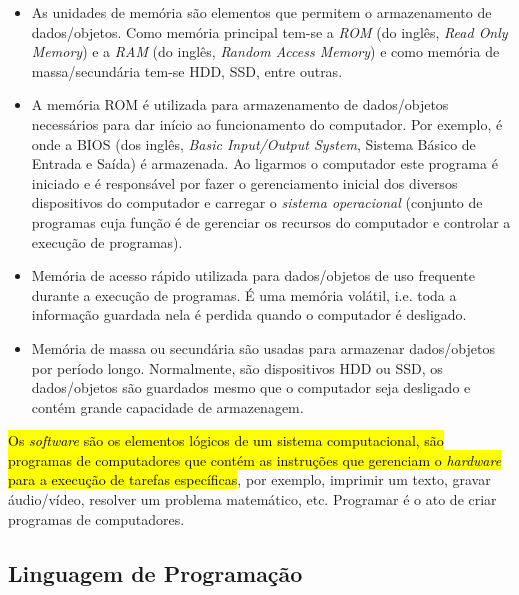 \begin{itemize}
\item {}

  As unidades de memória são elementos que permitem o armazenamento de dados/objetos. Como memória principal tem-se a \emph{ROM} (do inglês, \textit{Read Only Memory}) e a \emph{RAM} (do inglês, \textit{Random Access Memory}) e como memória de massa/secundária tem-se HDD, SSD, entre outras.

\item {}

  A memória ROM é utilizada para armazenamento de dados/objetos necessários para dar início ao funcionamento do computador. Por exemplo, é onde a BIOS (dos inglês, \textit{Basic Input/Output System}, Sistema Básico de Entrada e Saída) é armazenada. Ao ligarmos o computador este programa é iniciado e é responsável por fazer o gerenciamento inicial dos diversos dispositivos do computador e carregar o \emph{sistema operacional} (conjunto de programas cuja função é de gerenciar os recursos do computador e controlar a execução de programas).

\item {}

  Memória de acesso rápido utilizada para dados/objetos de uso frequente durante a execução de programas. É uma memória volátil, i.e. toda a informação guardada nela é perdida quando o computador é desligado.

\item {}

  Memória de massa ou secundária são usadas para armazenar dados/objetos por período longo. Normalmente, são dispositivos HDD ou SSD, os dados/objetos são guardados mesmo que o computador seja desligado e contém grande capacidade de armazenagem.   
\end{itemize}

\hl{Os \emph{software} são os elementos lógicos de um sistema computacional, são programas de computadores que contém as instruções que gerenciam o \emph{hardware} para a execução de tarefas específicas}, por exemplo, imprimir um texto, gravar áudio/vídeo, resolver um problema matemático, etc. Programar é o ato de criar programas de computadores.

\subsection{Linguagem de Programação}


